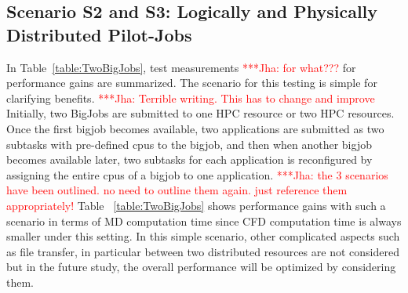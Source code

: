 \documentclass[conference,final]{IEEEtran}
\newcommand{\jhanote}[1]{ {\textcolor{red} { ***Jha: #1 }}}
\newcommand{\jhanote}[1]{}
\begin{document}
\subsection{Scenario S2 and S3: Logically and Physically Distributed
  Pilot-Jobs}


In Table~\ref{table:TwoBigJobs}, test measurements \jhanote{for
  what???}  for performance gains are summarized. The scenario for
this testing is simple for clarifying benefits.  \jhanote{Terrible
  writing. This has to change and improve} Initially, two BigJobs are
submitted to one HPC resource or two HPC resources. Once the first
bigjob becomes available, two applications are submitted as two
subtasks with pre-defined cpus to the bigjob, and then when another
bigjob becomes available later, two subtasks for each application is
reconfigured by assigning the entire cpus of a bigjob to one
application. \jhanote{the 3 scenarios have been outlined. no need to
  outline them again. just reference them appropriately!} Table
~\ref{table:TwoBigJobs} shows performance gains with such a scenario
in terms of MD computation time since CFD computation time is always smaller under
this setting. In this simple scenario, other complicated aspects such
as file transfer, in particular between two distributed resources are
not considered but in the future study, the overall performance will
be optimized by considering them.

\end{document}
